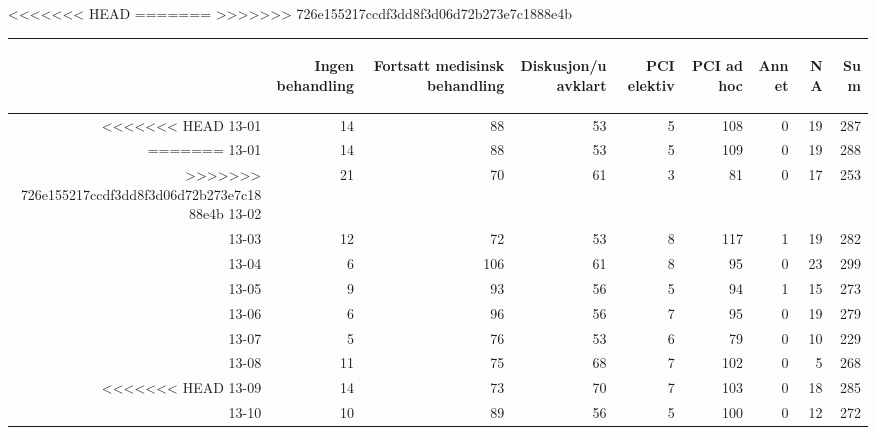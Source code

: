\documentclass[presentation,xcolor=pdftex,dvipsnames,table]{beamer}
\begin{document}
\begin{frame}
\begin{tiny}
<<<<<<< HEAD
=======
>>>>>>> 726e155217ccdf3dd8f3d06d72b273e7c1888e4b
\begin{table}[ht]
\centering
\begin{tabular}{rrrrrrrrr}
  \toprule
 & \begin{sideways} Ingen behandling \end{sideways} & \begin{sideways} Fortsatt medisinsk behandling \end{sideways} & \begin{sideways} Diskusjon/uavklart \end{sideways} & \begin{sideways} PCI elektiv \end{sideways} & \begin{sideways} PCI ad hoc \end{sideways} & \begin{sideways} Annet \end{sideways} & \begin{sideways} NA \end{sideways} & \begin{sideways} Sum \end{sideways} \\ 
  \midrule
<<<<<<< HEAD
13-01 & 14 & 88 & 53 & 5 & 108 & 0 & 19 & 287 \\ 
=======
13-01 & 14 & 88 & 53 & 5 & 109 & 0 & 19 & 288 \\ 
>>>>>>> 726e155217ccdf3dd8f3d06d72b273e7c1888e4b
  13-02 & 21 & 70 & 61 & 3 & 81 & 0 & 17 & 253 \\ 
  13-03 & 12 & 72 & 53 & 8 & 117 & 1 & 19 & 282 \\ 
  13-04 & 6 & 106 & 61 & 8 & 95 & 0 & 23 & 299 \\ 
  13-05 & 9 & 93 & 56 & 5 & 94 & 1 & 15 & 273 \\ 
  13-06 & 6 & 96 & 56 & 7 & 95 & 0 & 19 & 279 \\ 
  13-07 & 5 & 76 & 53 & 6 & 79 & 0 & 10 & 229 \\ 
  13-08 & 11 & 75 & 68 & 7 & 102 & 0 & 5 & 268 \\ 
<<<<<<< HEAD
  13-09 & 14 & 73 & 70 & 7 & 103 & 0 & 18 & 285 \\ 
  13-10 & 10 & 89 & 56 & 5 & 100 & 0 & 12 & 272 \\ 

\end{tabular}
\end{table}
\end{tiny}
\end{frame}
\end{document}
